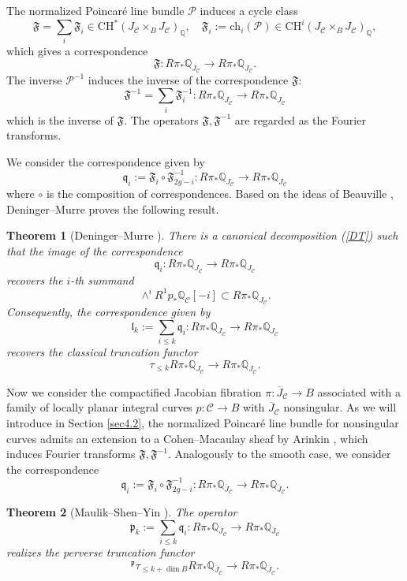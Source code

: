 \documentclass{pspum-l}
\theoremstyle{plain}
\newtheorem{thm}{Theorem}[section]
\theoremstyle{definition}
\theoremstyle{remark}
\newcommand{\BQ}{{\mathbb{Q}}}
\newcommand{\CC}{{\mathcal C}}
\newcommand{\CP}{{\mathcal P}}
\begin{document}
The normalized Poincar\'e line bundle $\CP$ induces a cycle class
\[
\mathfrak{F} = \sum_{i} \mathfrak{F}_i \in \mathrm{CH}^*(J_\CC \times_B J_\CC)_\BQ, \quad \mathfrak{F}_i:= \mathrm{ch}_i(\CP) \in \mathrm{CH}^i(J_\CC \times_B J_\CC)_\BQ,
\]
which gives a correspondence
\[
\mathfrak{F}: R\pi_* \BQ_{{J}_{\CC}} \to R\pi_* \BQ_{{J}_{\CC}}.
\]
The inverse $\CP^{-1}$ induces the inverse of the correspondence $\mathfrak{F}$:
\[
\mathfrak{F}^{-1} = \sum_{i} \mathfrak{F}^{-1}_i: R\pi_* \BQ_{{J}_{\CC}} \to R\pi_* \BQ_{{J}_{\CC}}
\]
which is the inverse of $\mathfrak{F}$. The operators $\mathfrak{F}, \mathfrak{F}^{-1}$ are regarded as the Fourier transforms.

We consider the correspondence given by 
\[
\mathfrak{q}_i:= \mathfrak{F}_i \circ \mathfrak{F}^{-1}_{2g-i} :   R\pi_* \BQ_{{J}_{\CC}} \to R\pi_* \BQ_{{J}_{\CC}}
\]
where $\circ$ is the composition of correspondences. Based on the ideas of Beauville \cite{B, B1}, Deninger--Murre \cite{DM} proves the following result.


\begin{thm}[Deninger--Murre \cite{DM}]
There is a canonical decomposition (\ref{DT}) such that the image of the correspondence 
\[
\mathfrak{q}_i:  R\pi_* \BQ_{{J}_{\CC}} \to R\pi_* \BQ_{{J}_{\CC}}
\]
recovers the $i$-th summand
\[
 \wedge^i R^1p_* \BQ_\CC[-i]  \subset R\pi_* \BQ_{J_\CC}.
\]
Consequently, the correspondence given by
\[
\mathfrak{l}_k:= \sum_{i\le k} \mathfrak{q}_i: R\pi_* \BQ_{J_\CC} \to R\pi_* \BQ_{J_\CC}
\]
recovers the classical truncation functor
\[
\tau_{\leq k} R\pi_* \BQ_{J_\CC} \to R\pi_* \BQ_{J_\CC}. 
\]
\end{thm}

 Now we consider the compactified Jacobian fibration $\pi: \overline{J}_\CC \to B$ associated with a family of locally planar integral curves $p: \CC \to B$ with $\overline{J}_\CC$ nonsingular. As we will introduce in Section \ref{sec4.2}, the normalized Poincar\'e line bundle for nonsingular curves admits an extension to a Cohen--Macaulay sheaf by Arinkin \cite{A2}, which induces Fourier transforms $\mathfrak{F}, \mathfrak{F}^{-1}$. Analogously to the smooth case, we consider the correspondence 
\[
\mathfrak{q}_i:= \mathfrak{F}_i \circ \mathfrak{F}^{-1}_{2g-i} :   R\pi_* \BQ_{\overline{J}_{\CC}} \to R\pi_* \BQ_{\overline{J}_{\CC}}.
\]

\begin{thm}[Maulik--Shen--Yin \cite{MSY}]\label{thm4.2}
    The operator
    \[
    \mathfrak{p}_k:= \sum_{i\leq k} \mathfrak{q}_i:   R\pi_* \BQ_{\overline{J}_{\CC}} \to R\pi_* \BQ_{\overline{J}_{\CC}}
    \]
    realizes the perverse truncation functor
    \[
    {^\mathfrak{p}}\tau_{\leq k+\dim B} R\pi_* \BQ_{\overline{J}_\CC} \to R\pi_* \BQ_{\overline{J}_\CC}.
    \]
\end{thm}
\end{document}
